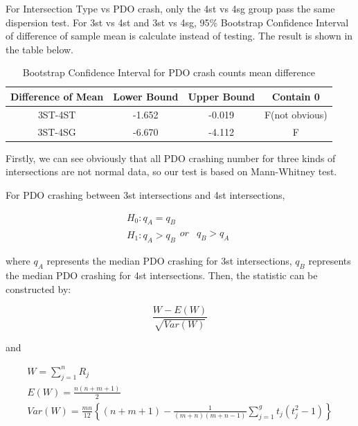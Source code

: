 \documentclass[11pt]{scrartcl} %
\begin{document}
For Intersection Type vs PDO crash, only the 4st vs 4sg group pass the same dispersion test. For 3st vs 4st and 3st vs 4sg, 95\% Bootstrap Confidence Interval of difference of sample mean is calculate instead of testing. The result is shown in the table below.

\begin{table}[H]
\caption{Bootstrap Confidence Interval for PDO crash counts mean difference}
\centering
\begin{tabular}{|c|c|c|c|}
\hline
Difference of Mean  & Lower Bound & Upper Bound & Contain 0 \\
\hline
3ST-4ST & -1.652 & -0.019 & F(not obvious) \\
\hline
3ST-4SG   & -6.670  & -4.112  & F \\
\hline
\end{tabular}
\end{table}

Firstly, we can see obviously that all PDO crashing number for three kinds of intersections are not normal data, so our test is based on Mann-Whitney test.

\par

For PDO crashing between 3st intersections and 4st intersections,

\begin{equation*}
\begin{array}{l}
{H_0}:{q_A} = {q_B}\\
{H_1}:{q_A} > {q_B}\begin{array}{*{20}{c}}
{or}&{{q_B} > {q_A}}
\end{array}
\end{array}
\end{equation*}

where ${q_A}$ represents the median PDO crashing for 3st intersections, $q_B$ represents the median PDO crashing for 4st intersections. Then, the statistic can be constructed by:

\begin{equation*}
\frac{{W - E\left( W \right)}}{{\sqrt {Var\left( W \right)} }}
\end{equation*}

and

\begin{equation}
\label{mw-stat}
\begin{array}{l}
W = \sum\limits_{j = 1}^n {{R_j}} \\
E\left( W \right) = \frac{{n\left( {n + m + 1} \right)}}{2}\\
Var\left( W \right) = \frac{{mn}}{{12}}\left\{ {\left( {n + m + 1} \right) - \frac{1}{{\left( {m + n} \right)\left( {m + n - 1} \right)}}\sum\limits_{j = 1}^g {{t_j}\left( {t_j^2 - 1} \right)} } \right\}
\end{array}
\end{equation}
\end{document}
